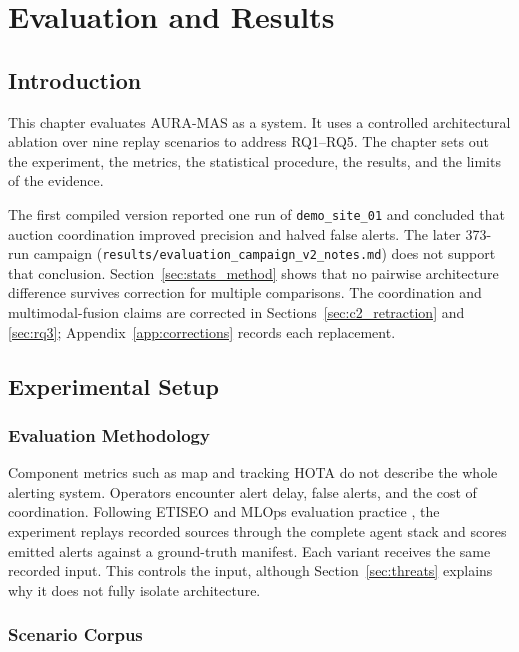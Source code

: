 \chapter{Evaluation and Results}
\label{chap:evaluation}

\section{Introduction}

This chapter evaluates AURA-MAS as a system. It uses a controlled architectural ablation over nine replay scenarios to address RQ1--RQ5. The chapter sets out the experiment, the metrics, the statistical procedure, the results, and the limits of the evidence.

\begin{revisionbox}
	The first compiled version reported one run of \texttt{demo\_site\_01} and concluded that auction coordination improved precision and halved false alerts. The later 373-run campaign (\texttt{results/evaluation\_campaign\_v2\_notes.md}) does not support that conclusion. Section~\ref{sec:stats_method} shows that no pairwise architecture difference survives correction for multiple comparisons. The coordination and multimodal-fusion claims are corrected in Sections~\ref{sec:c2_retraction} and \ref{sec:rq3}; Appendix~\ref{app:corrections} records each replacement.
\end{revisionbox}

\section{Experimental Setup}

\subsection{Evaluation Methodology}

Component metrics such as \gls{map} and tracking HOTA do not describe the whole alerting system. Operators encounter alert delay, false alerts, and the cost of coordination. Following ETISEO \cite{nghiem2007etiseo} and MLOps evaluation practice \cite{aicity2025, ruf2021demystifying}, the experiment replays recorded sources through the complete agent stack and scores emitted alerts against a ground-truth manifest. Each variant receives the same recorded input. This controls the input, although Section~\ref{sec:threats} explains why it does not fully isolate architecture.

\subsection{Scenario Corpus}
\label{sec:corpus}

